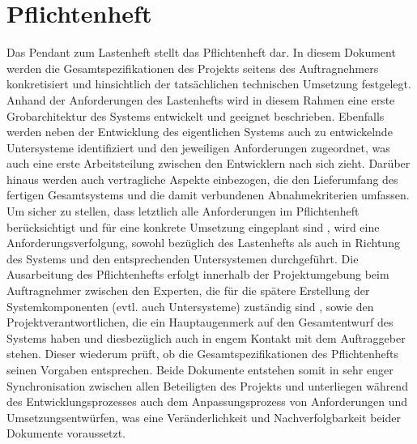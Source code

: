 \section{Pflichtenheft}
Das Pendant zum Lastenheft stellt das Pflichtenheft dar. 
In diesem Dokument werden die Gesamtspezifikationen des Projekts seitens des Auftragnehmers konkretisiert und hinsichtlich der tatsächlichen technischen Umsetzung festgelegt. Anhand der Anforderungen des Lastenhefts wird in diesem Rahmen eine erste Grobarchitektur des Systems entwickelt und geeignet beschrieben. Ebenfalls werden neben der Entwicklung des eigentlichen Systems auch zu entwickelnde 
Untersysteme identifiziert und den jeweiligen Anforderungen zugeordnet, was auch eine erste Arbeitsteilung zwischen den Entwicklern nach sich zieht. Darüber hinaus werden auch vertragliche Aspekte einbezogen, die den Lieferumfang des fertigen Gesamtsystems und die damit verbundenen Abnahmekriterien umfassen. Um sicher zu stellen, dass letztlich alle Anforderungen im Pflichtenheft berücksichtigt und für eine konkrete Umsetzung eingeplant sind
, wird eine Anforderungsverfolgung, sowohl bezüglich des Lastenhefts als auch in Richtung des Systems und den entsprechenden Untersystemen durchgeführt. Die Ausarbeitung des Pflichtenhefts erfolgt innerhalb der Projektumgebung beim Auftragnehmer zwischen den Experten, die für die spätere Erstellung der Systemkomponenten (evtl. auch Untersysteme) zuständig sind
, sowie den Projektverantwortlichen, die ein Hauptaugenmerk auf den Gesamtentwurf des Systems haben und diesbezüglich auch in engem Kontakt mit dem Auftraggeber stehen. Dieser wiederum prüft, ob die Gesamtspezifikationen des Pflichtenhefts seinen Vorgaben entsprechen. Beide Dokumente entstehen somit in sehr 
enger Synchronisation zwischen allen Beteiligten des Projekts und unterliegen während des Entwicklungsprozesses auch dem Anpassungsprozess von Anforderungen und Umsetzungsentwürfen, was eine Veränderlichkeit und Nachverfolgbarkeit beider Dokumente voraussetzt.

\cite{brd-lastenheft}
